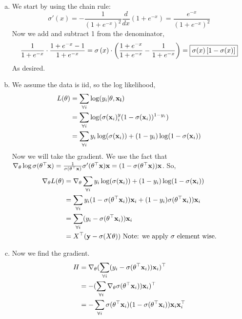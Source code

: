 \documentclass[12pt,letterpaper,fleqn]{hmcpset}
\begin{document}
\begin{solution}
	\begin{enumerate}[(a)]
		\item 
			We start by using the chain rule:
			$$\sigma'(x) = -\frac{1}{(1+e^{-x})^2}\frac{d}{dx}(1+e^{-x}) = \frac{e^{-x}}{(1+e^{-x})^2}$$
			Now we add and subtract 1 from the denominator,
			$$\frac{1}{1 + e^{-x}} \cdot \frac{1 + e^{-x} -1}{1+e^{-x}} = \sigma \left(x\right) \cdot \left(\frac{1 + e^{-x}}{1+e^{-x}} - \frac{1}{1 + e^{-x}} \right) = \fbox{$\sigma(x)\left[1 - \sigma(x)\right]$}$$
			As desired.
		\item
			We assume the data is iid, so the log likelihood, 
            \begin{align*}
                L(\theta) &= \sum_{\forall i}\log (y_i | \theta, \bf{x}_i)\\
                &= \sum_{\forall i} \log(\sigma({\bf x}_i)^y_i (1-\sigma({\bf x}_i))^{1-y_i})\\
                &= \sum_{\forall i} y_i \log(\sigma({\bf x}_i)) + (1-y_i)\log(1-\sigma({\bf x}_i))
            \end{align*}
			Now we will take the gradient. We use the fact that $\nabla_\theta \log \sigma(\theta^\top {\bf x}) = \frac{1}{ \sigma( \theta^\top {\bf x})}\sigma '(\theta^\top  {\bf x}) {\bf x} = (1 - \sigma( \theta^\top {\bf x})){\bf x}$. So,
                \begin{align*}
                    \nabla_\theta L(\theta) &= \nabla_\theta \sum_{\forall i} y_i \log(\sigma({\bf x}_i)) + (1-y_i)\log(1-\sigma({\bf x}_i))\\
                    &= \sum_{\forall i} y_i (1 - \sigma( \theta^\top {\bf x}_i)){\bf x}_i + (1-y_i) \sigma( \theta^\top {\bf x}_i)){\bf x}_i\\
                    &= \sum_{\forall i} (y_i - \sigma( \theta^\top {\bf x}_i)){\bf x}_i\\
                    &= X^\top({\bf y} - \sigma(X\theta)) \text{ Note: we apply $\sigma$ element wise.}
                \end{align*}
        \item
            Now we find the gradient.
                \begin{align*}
                    H &= \nabla_\theta (\sum_{\forall i} (y_i - \sigma( \theta^\T \xx_i))\xx_i)^\T\\
                    &= -(\sum_{\forall i} \nabla_\theta \sigma( \theta^\T \xx_i))\xx_i)^\T\\
                    &= -\sum_{\forall i} \sigma( \theta^\T \xx_i)(1 -  \sigma( \theta^\T \xx_i))\xx_i\xx_i^\T\\

\end{align*}
\end{enumerate}
\end{solution}
\end{document}
